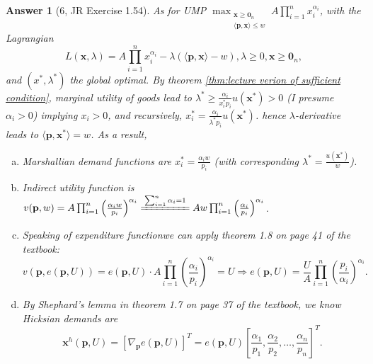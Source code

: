 \documentclass{article}
\newtheorem*{ans}{Answer}
\newcommand{\1}{{\bf 1}}
\newcommand{\0}{{\mathbf{0}}}
\newcommand{\p}{{\mathbf{p}}}
\newcommand{\x}{{\mathbf{x}}}
\newcommand{\<}{\langle}
\renewcommand{\>}{\rangle}
\newcommand{\dps}{\displaystyle}
\begin{document}
\begin{ans}[6, JR Exercise 1.54] As for UMP $\dps \max_{\substack{ \x \ge \0_n \\ \langle \p ,\x \rangle \le w} } A \prod_{i=1}^n x_i^{\alpha_i}$, with the Lagrangian
	$$
	L\left( \x, \lambda\right) =  A \prod_{i=1}^n x_i^{\alpha_i} - \lambda (\langle \p ,\x \rangle -   w ), \lambda \ge 0, \x \ge \0_n,
	$$
	and $(
	x^*,\lambda^*)$ the global optimal. By theorem \ref{thm:lecture verion of sufficient condition}, marginal utility of goods lead to $  \lambda^*  \ge \frac{ \alpha_i }{x_i^* p_i} u(\x^*) >0 $ (I presume $\alpha_i >0 $) implying $x_i >0$, and recursively,  $x_i^* =  \frac{ \alpha_i }{\lambda^*  p_i} u(\x^*) $. hence $\lambda$-derivative leads to $\langle \p ,\x^* \rangle  =    w $. As a result,
	\begin{enumerate}[(a)]
		\item Marshallian demand functions are $x_i^* = \frac{ \alpha_i w}{p_i}$ (with corresponding $\lambda^* = \frac{ u (\x^*)}{w }$).
		\item Indirect utility function is $v(\p,w) =   A \prod_{i=1}^n  \left(  \frac{ \alpha_i w}{p_i} \right)^{\alpha_i} \xlongequal{\sum_{i=1}^n \alpha_i = 1}  A w  \prod_{i=1}^n \left(  \frac{ \alpha_i }{p_i} \right)^{\alpha_i}$.
		\item Speaking of expenditure functionwe can apply theorem 1.8 on page 41 of the textbook:
		$$v\left(\p, e(\p,U)\right)  = e(\p,U) \cdot  A  \prod_{i=1}^n \left(  \frac{ \alpha_i }{p_i} \right)^{\alpha_i}= U \Rightarrow  e(\p,U)  = \frac{U}A  \prod_{i=1}^n \left(  \frac{p_i}{ \alpha_i } \right)^{ \alpha_i}. $$
		
		\item By Shephard’s lemma in theorem 1.7 on page 37 of the textbook, we know Hicksian demands are
		$$ \x^h (\p,U)  = \left[\nabla_{\p} e(\p,U)\right]^T = e(\p,U) \left[ \frac{\alpha_1}{p_1}, \frac{\alpha_2}{p_2}, \ldots, \frac{\alpha_n}{p_n} \right]^T.
		$$
	\end{enumerate}
\end{ans}
\end{document}
